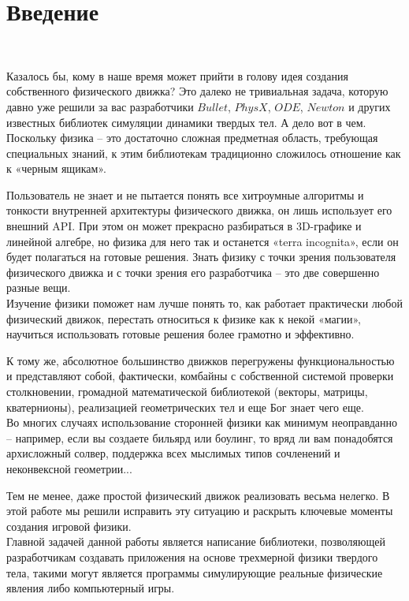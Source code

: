 \chapter*{Введение}
\

Казалось бы, кому в наше время может прийти в голову
идея создания собственного физического движка? Это далеко не
тривиальная задача, которую давно уже решили за вас
разработчики $Bullet$, $PhysX$, $ODE$, $Newton$ и других известных
библиотек симуляции динамики твердых тел. А дело вот в чем.
\\

Поскольку физика – это достаточно сложная предметная
область, требующая специальных знаний, к этим библиотекам
традиционно сложилось отношение как к «черным ящикам».

Пользователь не знает и не пытается понять все хитроумные
алгоритмы и тонкости внутренней архитектуры физического
движка, он лишь использует его внешний API. При этом он
может прекрасно разбираться в 3D-графике и линейной
алгебре, но физика для него так и останется «terra incognita»,
если он будет полагаться на готовые решения.
Знать физику с точки зрения пользователя физического
движка и с точки зрения его разработчика – это две совершенно
разные вещи.
\\

Изучение физики поможет нам лучше понять то,
как работает практически любой физический движок, перестать
относиться к физике как к некой «магии», научиться
использовать готовые решения более грамотно и эффективно.

К тому же, абсолютное большинство движков перегружены
функциональностью и представляют собой, фактически,
комбайны с собственной системой проверки столкновении,
громадной математической библиотекой (векторы, матрицы,
кватернионы), реализацией геометрических тел и еще Бог знает
чего еще. 
\\

Во многих случаях использование сторонней
физики как минимум неоправданно – например, если вы
создаете бильярд или боулинг, то вряд ли вам понадобятся
архисложный солвер, поддержка всех мыслимых типов
сочленений и неконвексной геометрии...

Тем не менее, даже простой физический движок
реализовать весьма нелегко. В этой работе мы решили исправить эту
ситуацию и раскрыть ключевые моменты создания игровой физики.
\\

Главной задачей данной работы является написание библиотеки,
позволяющей разработчикам создавать приложения на основе трехмерной
физики твердого тела, такими могут является программы симулирующие реальные 
физические явления либо компьютерный игры.

